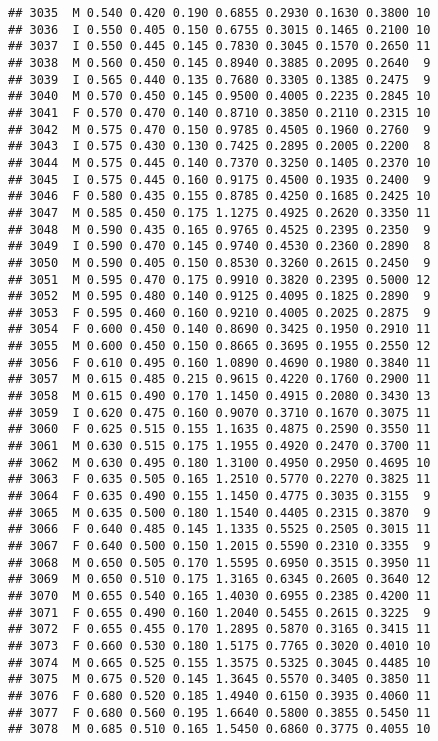 \documentclass[
]{article}
\begin{document}
\begin{verbatim}
## 3035  M 0.540 0.420 0.190 0.6855 0.2930 0.1630 0.3800 10
## 3036  I 0.550 0.405 0.150 0.6755 0.3015 0.1465 0.2100 10
## 3037  I 0.550 0.445 0.145 0.7830 0.3045 0.1570 0.2650 11
## 3038  M 0.560 0.450 0.145 0.8940 0.3885 0.2095 0.2640  9
## 3039  I 0.565 0.440 0.135 0.7680 0.3305 0.1385 0.2475  9
## 3040  M 0.570 0.450 0.145 0.9500 0.4005 0.2235 0.2845 10
## 3041  F 0.570 0.470 0.140 0.8710 0.3850 0.2110 0.2315 10
## 3042  M 0.575 0.470 0.150 0.9785 0.4505 0.1960 0.2760  9
## 3043  I 0.575 0.430 0.130 0.7425 0.2895 0.2005 0.2200  8
## 3044  M 0.575 0.445 0.140 0.7370 0.3250 0.1405 0.2370 10
## 3045  I 0.575 0.445 0.160 0.9175 0.4500 0.1935 0.2400  9
## 3046  F 0.580 0.435 0.155 0.8785 0.4250 0.1685 0.2425 10
## 3047  M 0.585 0.450 0.175 1.1275 0.4925 0.2620 0.3350 11
## 3048  M 0.590 0.435 0.165 0.9765 0.4525 0.2395 0.2350  9
## 3049  I 0.590 0.470 0.145 0.9740 0.4530 0.2360 0.2890  8
## 3050  M 0.590 0.405 0.150 0.8530 0.3260 0.2615 0.2450  9
## 3051  M 0.595 0.470 0.175 0.9910 0.3820 0.2395 0.5000 12
## 3052  M 0.595 0.480 0.140 0.9125 0.4095 0.1825 0.2890  9
## 3053  F 0.595 0.460 0.160 0.9210 0.4005 0.2025 0.2875  9
## 3054  F 0.600 0.450 0.140 0.8690 0.3425 0.1950 0.2910 11
## 3055  M 0.600 0.450 0.150 0.8665 0.3695 0.1955 0.2550 12
## 3056  F 0.610 0.495 0.160 1.0890 0.4690 0.1980 0.3840 11
## 3057  M 0.615 0.485 0.215 0.9615 0.4220 0.1760 0.2900 11
## 3058  M 0.615 0.490 0.170 1.1450 0.4915 0.2080 0.3430 13
## 3059  I 0.620 0.475 0.160 0.9070 0.3710 0.1670 0.3075 11
## 3060  F 0.625 0.515 0.155 1.1635 0.4875 0.2590 0.3550 11
## 3061  M 0.630 0.515 0.175 1.1955 0.4920 0.2470 0.3700 11
## 3062  M 0.630 0.495 0.180 1.3100 0.4950 0.2950 0.4695 10
## 3063  F 0.635 0.505 0.165 1.2510 0.5770 0.2270 0.3825 11
## 3064  F 0.635 0.490 0.155 1.1450 0.4775 0.3035 0.3155  9
## 3065  M 0.635 0.500 0.180 1.1540 0.4405 0.2315 0.3870  9
## 3066  F 0.640 0.485 0.145 1.1335 0.5525 0.2505 0.3015 11
## 3067  F 0.640 0.500 0.150 1.2015 0.5590 0.2310 0.3355  9
## 3068  M 0.650 0.505 0.170 1.5595 0.6950 0.3515 0.3950 11
## 3069  M 0.650 0.510 0.175 1.3165 0.6345 0.2605 0.3640 12
## 3070  M 0.655 0.540 0.165 1.4030 0.6955 0.2385 0.4200 11
## 3071  F 0.655 0.490 0.160 1.2040 0.5455 0.2615 0.3225  9
## 3072  F 0.655 0.455 0.170 1.2895 0.5870 0.3165 0.3415 11
## 3073  F 0.660 0.530 0.180 1.5175 0.7765 0.3020 0.4010 10
## 3074  M 0.665 0.525 0.155 1.3575 0.5325 0.3045 0.4485 10
## 3075  M 0.675 0.520 0.145 1.3645 0.5570 0.3405 0.3850 11
## 3076  F 0.680 0.520 0.185 1.4940 0.6150 0.3935 0.4060 11
## 3077  F 0.680 0.560 0.195 1.6640 0.5800 0.3855 0.5450 11
## 3078  M 0.685 0.510 0.165 1.5450 0.6860 0.3775 0.4055 10

\end{verbatim}
\end{document}
